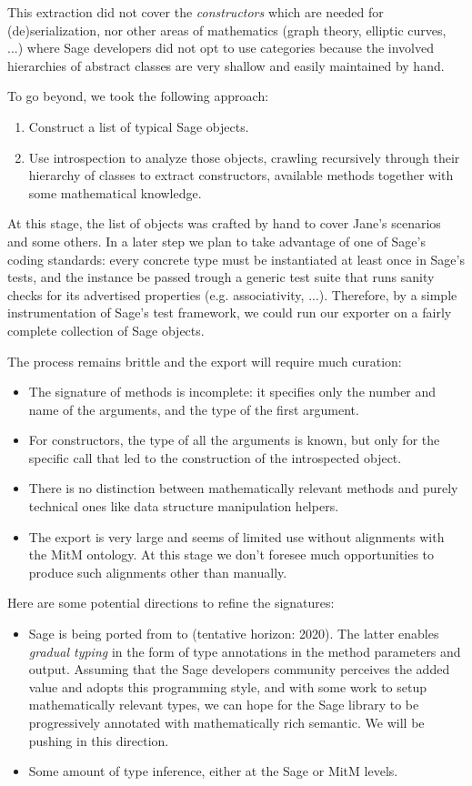 This extraction did not cover the \emph{constructors} which are needed
for (de)serialization, nor other areas of mathematics (graph theory,
elliptic curves, ...) where Sage developers did not opt to use
categories because the involved hierarchies of abstract classes are
very shallow and easily maintained by hand.

To go beyond, we took the following approach:
\begin{enumerate}
\item Construct a list of typical Sage objects.
\item Use introspection to analyze those objects, crawling recursively
  through their hierarchy of classes to extract constructors,
  available methods together with some mathematical knowledge.
\end{enumerate}

At this stage, the list of objects was crafted by hand to cover Jane's
scenarios and some others. In a later step we plan to take advantage
of one of Sage's coding standards: every concrete type must be
instantiated at least once in Sage's tests, and the instance be passed
trough a generic test suite that runs sanity checks for its advertised
properties (e.g. associativity, ...). Therefore, by a simple
instrumentation of Sage's test framework, we could run our exporter on
a fairly complete collection of Sage objects.

The process remains brittle and the export will require much curation:
\begin{itemize}
\item The signature of methods is incomplete: it specifies only the
  number and name of the arguments, and the type of the first
  argument.
\item For constructors, the type of all the arguments is known, but
  only for the specific call that led to the construction of the
  introspected object.
\item There is no distinction between mathematically relevant methods
  and purely technical ones like data structure manipulation helpers.
\item The export is very large and seems of limited use without
  alignments with the MitM ontology. At this stage we don't foresee
  much opportunities to produce such alignments other than manually.
\end{itemize}

Here are some potential directions to refine the signatures:
\begin{itemize}
\item Sage is being ported from  to  (tentative
  horizon: 2020). The latter enables \emph{gradual typing} in the form
  of type annotations in the method parameters and output. Assuming
  that the Sage developers community perceives the added value and
  adopts this programming style, and with some work to setup
  mathematically relevant types, we can hope for the Sage library to
  be progressively annotated with mathematically rich semantic. We
  will be pushing in this direction.
\item Some amount of type inference, either at the Sage or MitM levels.
\end{itemize}


